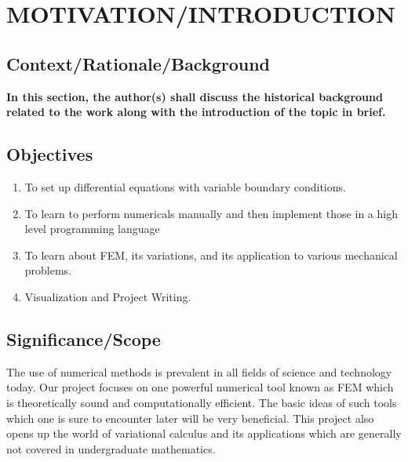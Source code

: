 




\chapter{MOTIVATION/INTRODUCTION}

\section{{\bf{Context/Rationale/Background}}}
{\bf\color{red}In this section, the author(s) shall discuss the  historical background related to the work along with the introduction of the topic in brief.}








\section{{\bf{Objectives}}}
{\bf\color{black}
\begin{enumerate}
 \item To set up differential equations with variable boundary conditions. 
 \item  To learn to perform numericals manually and then implement
 those in a high level programming language
 \item To learn about FEM, its variations, and its application to various
 mechanical problems.
 \item Visualization and Project Writing.
\end{enumerate}
}

\section{\bf Significance/Scope}


The use of numerical methods is prevalent in all fields of science and technology today. Our project focuses on one powerful numerical tool known as FEM which is theoretically sound and computationally efficient. The basic ideas of such tools which one is sure to encounter later will be very beneficial. This project also opens up the world of variational calculus and its applications which are generally not covered in undergraduate mathematics.


